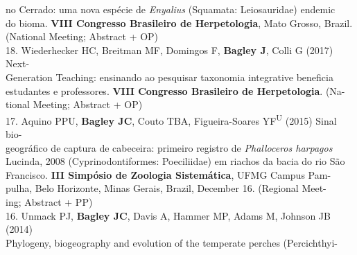 \documentclass[margin,line]{res}
\begin{document}
\begin{resume}
\hspace*{8mm} no Cerrado: uma nova esp\'{e}cie de \emph{Enyalius} (Squamata: Leiosauridae) endemic\\
\hspace*{8mm} do bioma. \textbf{VIII Congresso Brasileiro de Herpetologia}, Mato Grosso, Brazil.\\ \vspace{2mm} 
\hspace*{8mm}(National Meeting; Abstract + OP) \\
18. Wiederhecker HC, Breitman MF, Domingos F, \textbf{Bagley J}, Colli G (2017) Next-\\
\hspace*{8mm} Generation Teaching: ensinando ao pesquisar taxonomia integrative beneficia\\
\hspace*{8mm} estudantes e professores. \textbf{VIII Congresso Brasileiro de Herpetologia}. (Na-\\ \vspace{2mm}
\hspace*{8mm}tional Meeting; Abstract + OP) \\
17. Aquino PPU, \textbf{Bagley JC}, Couto TBA, Figueira-Soares YF\textsuperscript{U} (2015) Sinal bio-\\
\hspace*{8mm} geogr\'{a}fico de captura de cabeceira: primeiro registro de \emph{Phalloceros harpagos}\\
\hspace*{8mm} Lucinda, 2008 (Cyprinodontiformes: Poeciliidae) em riachos da bacia do rio S\~{a}o\\
\hspace*{8mm} Francisco. \textbf{III Simp\'{o}sio de Zoologia Sistem\'{a}tica}, UFMG Campus Pam-\\
\hspace*{8mm}pulha, Belo Horizonte, Minas Gerais, Brazil, December 16. (Regional Meet-\\ \vspace{2mm}
\hspace*{8mm}ing; Abstract + PP) \\
16. Unmack PJ, \textbf{Bagley JC}, Davis A, Hammer MP, Adams M, Johnson JB (2014)\\
\hspace*{8mm} Phylogeny, biogeography and evolution of the temperate perches (Percichthyi-\\

\end{resume}
\end{document}
